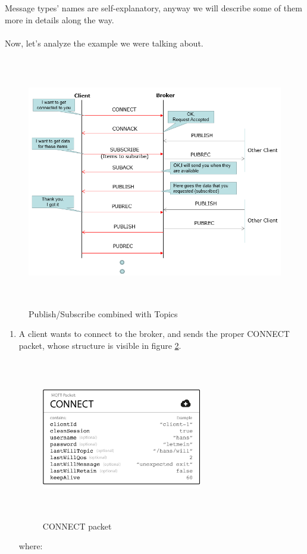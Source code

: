 \documentclass[12pt]{report}
\begin{document}
{Message types' names are self-explanatory, anyway we will describe some of them more in details along the way.\\\\
Now, let's analyze the example we were talking about.

\begin{figure}[H]
\includegraphics[width=12cm,height=11cm,keepaspectratio]{pubsub_schema1}
\centering
\caption{Publish/Subscribe combined with Topics}
\label{fig:pubsubschema}
\end{figure}

\begin{enumerate}
\setlength{\itemindent}{+5mm}
\item A client wants to connect to the broker, and sends the proper CONNECT packet, whose structure is visible in figure \ref{fig:connectpacket}.

\begin{figure}[H]
\includegraphics[width=7cm,height=7cm,keepaspectratio]{connect_message}
\centering
\caption{CONNECT packet}
\label{fig:connectpacket}
\end{figure}
where:


\end{enumerate}}
\end{document}

